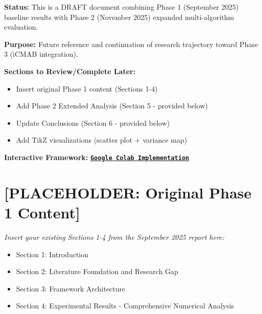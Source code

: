 \documentclass[11pt,a4paper]{article}
\newcommand{\colab}[1]{\textcolor{colabcolor}{\textbf{#1}}}
\begin{document}
\newpage

{\small\tableofcontents}
\newpage

\begin{tcolorbox}[colback=colabcolor!20,colframe=colabcolor,title=\textbf{📋 Draft Document Note}]
\textbf{Status:} This is a DRAFT document combining Phase 1 (September 2025) baseline results with Phase 2 (November 2025) expanded multi-algorithm evaluation.

\textbf{Purpose:} Future reference and continuation of research trajectory toward Phase 3 (iCMAB integration).

\textbf{Sections to Review/Complete Later:}
\begin{itemize}
    \item Insert original Phase 1 content (Sections 1-4)
    \item Add Phase 2 Extended Analysis (Section 5 - provided below)
    \item Update Conclusions (Section 6 - provided below)
    \item Add TikZ visualizations (scatter plot + variance map)
\end{itemize}

\textbf{Interactive Framework:} \href{https://colab.research.google.com/drive/1JWB3CS-Q37I58EcQKUKe-k-q2PH8WM0U}{\colab{\texttt{Google Colab Implementation}}}
\end{tcolorbox}

\newpage


\section*{[PLACEHOLDER: Original Phase 1 Content]}

\textit{Insert your existing Sections 1-4 from the September 2025 report here:}
\begin{itemize}
    \item Section 1: Introduction
    \item Section 2: Literature Foundation and Research Gap
    \item Section 3: Framework Architecture
    \item Section 4: Experimental Results - Comprehensive Numerical Analysis
\end{itemize}
\end{document}
